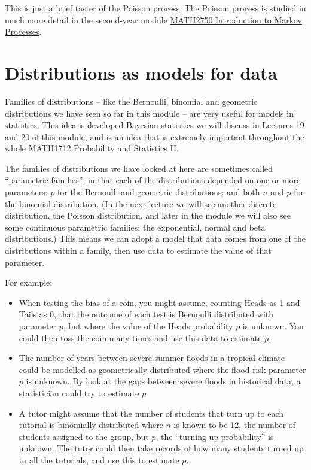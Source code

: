\documentclass[
  a4paper,
]{book}
\providecommand{\tightlist}{%
  \setlength{\itemsep}{0pt}\setlength{\parskip}{0pt}}
\theoremstyle{definition}
\theoremstyle{definition}
\theoremstyle{definition}
\theoremstyle{definition}
\theoremstyle{remark}
\begin{document}
This is just a brief taster of the Poisson process. The Poisson process is studied in much more detail in the second-year module \href{https://mpaldridge.github.io/math2750/}{MATH2750 Introduction to Markov Processes}.

\hypertarget{models}{%
\section{Distributions as models for data}\label{models}}

Families of distributions -- like the Bernoulli, binomial and geometric distributions we have seen so far in this module -- are very useful for models in statistics. This idea is developed Bayesian statistics we will discuss in Lectures 19 and 20 of this module, and is an idea that is extremely important throughout the whole MATH1712 Probability and Statistics II.

The families of distributions we have looked at here are sometimes called ``parametric families'', in that each of the distributions depended on one or more parameters: \(p\) for the Bernoulli and geometric distributions; and both \(n\) and \(p\) for the binomial distribution. (In the next lecture we will see another discrete distribution, the Poisson distribution, and later in the module we will also see some continuous parametric families: the exponential, normal and beta distributions.) This means we can adopt a model that data comes from one of the distributions within a family, then use data to estimate the value of that parameter.

For example:

\begin{itemize}
\tightlist
\item
  When testing the bias of a coin, you might assume, counting Heads as 1 and Tails as 0, that the outcome of each test is Bernoulli distributed with parameter \(p\), but where the value of the Heads probability \(p\) is unknown. You could then toss the coin many times and use this data to estimate \(p\).
\item
  The number of years between severe summer floods in a tropical climate could be modelled as geometrically distributed where the flood risk parameter \(p\) is unknown. By look at the gaps between severe floods in historical data, a statistician could try to estimate \(p\).
\item
  A tutor might assume that the number of students that turn up to each tutorial is binomially distributed where \(n\) is known to be 12, the number of students assigned to the group, but \(p\), the ``turning-up probability'' is unknown. The tutor could then take records of how many students turned up to all the tutorials, and use this to estimate \(p\).
\end{itemize}
\end{document}

